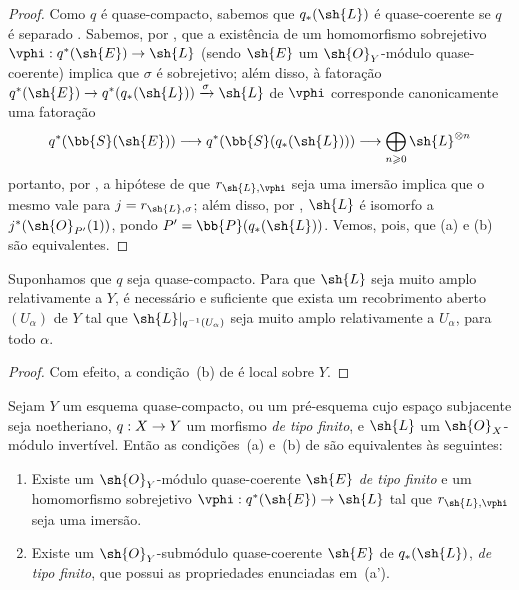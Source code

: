 \documentclass[oneside,10pt]{amsart}
\makeatletter
\renewcommand{\geq}{\geqslant}
\newcommand{\ega@arrow}[2]{\mathchoice{#1}{#2}{#2}{#2}}
\renewcommand{\to}{\ega@arrow{\longrightarrow}{\rightarrow}}
\newcommand{\oldpage}[2][]{\marginnote{\normalfont\footnotesize\textbf{#1}~|~#2}\ignorespaces}
\let\EGAOriginalLabel\label
\renewcommand{\label}[1]{\phantomsection\EGAOriginalLabel{#1}}
\makeatother
\begin{document}
\begin{proof}
Como $q$ é quase-compacto, sabemos que $q_*(\sh{L})$ é quase-coerente se $q$ é separado .
\oldpage[II]{80}
Sabemos, por , que a existência de um homomorfismo sobrejetivo $\vphi:q^*(\sh{E})\to\sh{L}$ (sendo $\sh{E}$ um $\sh{O}_Y$-módulo quase-coerente) implica que $\sigma$ é sobrejetivo;
além disso, à fatoração $q^*(\sh{E})\to q^*(q_*(\sh{L}))\xrightarrow{\sigma}\sh{L}$ de $\vphi$ corresponde canonicamente uma fatoração
\[
  q^*(\bb{S}(\sh{E}))\to q^*(\bb{S}(q_*(\sh{L})))\to\bigoplus_{n\geq0}\sh{L}^{\otimes n}
\]
portanto, por , a hipótese de que $r_{\sh{L},\vphi}$ seja uma imersão implica que o mesmo vale para $j=r_{\sh{L},\sigma}$;
além disso, por , $\sh{L}$ é isomorfo a $j^*(\sh{O}_{P'}(1))$, pondo $P'=\bb{P}(q_*(\sh{L}))$.
Vemos, pois, que (a) e (b) são equivalentes.
\end{proof}

\begin{corollary}[4.4.5]
\label{II.4.4.5}
Suponhamos que $q$ seja quase-compacto.
Para que $\sh{L}$ seja muito amplo relativamente a $Y$, é necessário e suficiente que exista um recobrimento aberto $(U_\alpha)$ de $Y$ tal que $\sh{L}|_{q^{-1}(U_\alpha)}$ seja muito amplo relativamente a $U_\alpha$, para todo $\alpha$.
\end{corollary}

\begin{proof}
Com efeito, a condição~(b) de  é local sobre $Y$.
\end{proof}

\begin{proposition}[4.4.6]
\label{II.4.4.6}
Sejam $Y$ um esquema quase-compacto, ou um pré-esquema cujo espaço subjacente seja noetheriano, $q:X\to Y$ um morfismo \emph{de tipo finito}, e $\sh{L}$ um $\sh{O}_X$-módulo invertível.
Então as condições~(a) e~(b) de  são equivalentes às seguintes:
\begin{enumerate}
  \item[\rm{(a')}] Existe um $\sh{O}_Y$-módulo quase-coerente $\sh{E}$ \emph{de tipo finito} e um homomorfismo sobrejetivo $\vphi:q^*(\sh{E})\to\sh{L}$ tal que $r_{\sh{L},\vphi}$ seja uma imersão.
  \item[\rm{(b')}] Existe um $\sh{O}_Y$-submódulo quase-coerente $\sh{E}$ de $q_*(\sh{L})$, \emph{de tipo finito}, que possui as propriedades enunciadas em~(a').
\end{enumerate}
\end{proposition}
\end{document}
